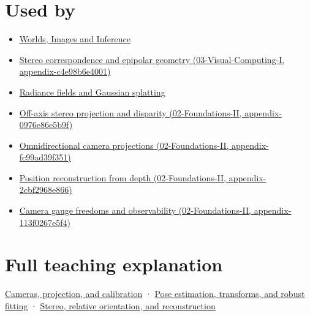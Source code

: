 \section{Used by}\label{appendix-3ee9861904d5-used-by}

\begin{itemize}
\item
  \href{Continuous\%20Notes/University\%20-\%20Worlds,\%20Images\%20and\%20Inference\%20-\%20Graphics,\%20Vision\%20and\%20Photography}{Worlds, Images and Inference}
\item
  \href{../03-Visual-Computing-I/main.pdf\#nameddest=appendix-c4e98b6e4001}{Stereo correspondence and epipolar geometry (03-Visual-Computing-I, appendix-c4e98b6e4001)}
\item
  \hyperref[appendix-c5b332e400e7]{Radiance fields and Gaussian splatting}
\item
  \href{../02-Foundations-II/main.pdf\#nameddest=appendix-0976e86e5b9f}{Off-axis stereo projection and disparity (02-Foundations-II, appendix-0976e86e5b9f)}
\item
  \href{../02-Foundations-II/main.pdf\#nameddest=appendix-fc99ad39f351}{Omnidirectional camera projections (02-Foundations-II, appendix-fc99ad39f351)}
\item
  \href{../02-Foundations-II/main.pdf\#nameddest=appendix-2cbf2968e866}{Position reconstruction from depth (02-Foundations-II, appendix-2cbf2968e866)}
\item
  \href{../02-Foundations-II/main.pdf\#nameddest=appendix-113f0267e5f4}{Camera gauge freedoms and observability (02-Foundations-II, appendix-113f0267e5f4)}
\end{itemize}

\section{Full teaching explanation}\label{appendix-3ee9861904d5-full-teaching-explanation}

\href{Continuous\%20Notes/University\%20-\%20Worlds,\%20Images\%20and\%20Inference\%20-\%20Graphics,\%20Vision\%20and\%20Photography\#Cameras,\%20projection,\%20and\%20calibration}{Cameras, projection, and calibration} · \href{Continuous\%20Notes/University\%20-\%20Worlds,\%20Images\%20and\%20Inference\%20-\%20Graphics,\%20Vision\%20and\%20Photography\#Pose\%20estimation,\%20transforms,\%20and\%20robust\%20fitting}{Pose estimation, transforms, and robust fitting} · \href{Continuous\%20Notes/University\%20-\%20Worlds,\%20Images\%20and\%20Inference\%20-\%20Graphics,\%20Vision\%20and\%20Photography\#Stereo,\%20relative\%20orientation,\%20and\%20reconstruction}{Stereo, relative orientation, and reconstruction}

